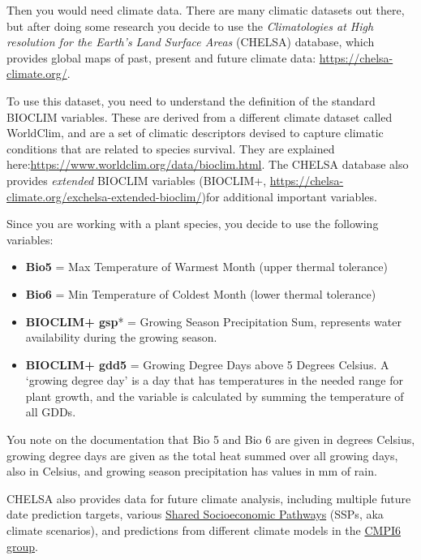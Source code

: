 \documentclass[
  letterpaper,
  DIV=11,
  numbers=noendperiod]{scrreprt}
\begin{document}
Then you would need climate data. There are many climatic datasets out
there, but after doing some research you decide to use the
\emph{Climatologies at High resolution for the Earth's Land Surface
Areas} (CHELSA) database, which provides global maps of past, present
and future climate data: \url{https://chelsa-climate.org/}.

To use this dataset, you need to understand the definition of the
standard BIOCLIM variables. These are derived from a different climate
dataset called WorldClim, and are a set of climatic descriptors devised
to capture climatic conditions that are related to species survival.
They are explained
here:\href{https://www.worldclim.org/data/}{https://www.worldclim.org/data/bioclim.html}.
The CHELSA database also provides \emph{extended} BIOCLIM variables
(BIOCLIM+,
\url{https://chelsa-climate.org/exchelsa-extended-bioclim/})for
additional important variables.

Since you are working with a plant species, you decide to use the
following variables:

\begin{itemize}
\item
  \textbf{Bio5} = Max Temperature of Warmest Month (upper thermal
  tolerance)
\item
  \textbf{Bio6} = Min Temperature of Coldest Month (lower thermal
  tolerance)
\item
  \textbf{BIOCLIM+ gsp}* = Growing Season Precipitation Sum, represents
  water availability during the growing season.
\item
  \textbf{BIOCLIM+ gdd5} = Growing Degree Days above 5 Degrees Celsius.
  A `growing degree day' is a day that has temperatures in the needed
  range for plant growth, and the variable is calculated by summing the
  temperature of all GDDs.
\end{itemize}

You note on the documentation that Bio 5 and Bio 6 are given in degrees
Celsius, growing degree days are given as the total heat summed over all
growing days, also in Celsius, and growing season precipitation has
values in mm of rain.

CHELSA also provides data for future climate analysis, including
multiple future date prediction targets, various
\href{https://www.carbonbrief.org/explainer-how-shared-socioeconomic-pathways-explore-future-climate-change/}{Shared
Socioeconomic Pathways} (SSPs, aka climate scenarios), and predictions
from different climate models in the
\href{https://www.carbonbrief.org/cmip6-the-next-generation-of-climate-models-explained/}{CMPI6
group}.
\end{document}
